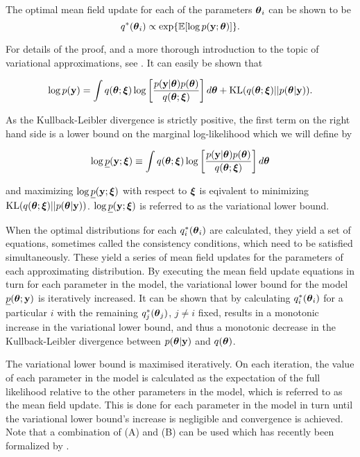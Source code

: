 The optimal mean field update for each of the parameters ${\boldsymbol \theta}_i$ can be shown to be
$$
	q^*({\boldsymbol \theta}_i) \propto \exp \{ \mathbb{E} [\log p({\bf y}; {\boldsymbol \theta})] \}.
$$

\noindent For details of the proof, and a more thorough introduction to the topic of variational
approximations, see \cite{Ormerod2010}. It can easily be shown that

$$
	\displaystyle \log p({\bf y}) = \int q({\boldsymbol \theta};{\boldsymbol \xi}) \log \left[ \frac{p({\bf y}|{\boldsymbol \theta})p({\boldsymbol \theta})}{q({\boldsymbol \theta};{\boldsymbol \xi})} \right] d{\boldsymbol \theta} + \text{KL}(q({\boldsymbol \theta};{\boldsymbol \xi})||p({\boldsymbol \theta}|{\bf y})).
$$

\noindent As the Kullback-Leibler divergence is strictly positive, the first term on the right hand side
is a lower bound on the marginal log-likelihood which we will define by

$$
	\displaystyle \log \underline{p}({\bf y};{\boldsymbol \xi}) \equiv \int q({\boldsymbol \theta};{\boldsymbol \xi})  \log \left[ \frac{p({\bf y}|{\boldsymbol \theta})p({\boldsymbol \theta})}{q({\boldsymbol \theta};{\boldsymbol \xi})} \right] d{\boldsymbol \theta}
$$

\noindent and maximizing $\log \underline{p}({\bf y};{\boldsymbol \xi})$ with respect to ${\boldsymbol \xi}$ is eqivalent to minimizing
$\text{KL}(q({\boldsymbol \theta};{\boldsymbol \xi})||p({\boldsymbol \theta}|{\bf y}))$. $\log \underline{p}({\bf y};{\boldsymbol \xi})$ is referred to as the
variational lower bound.

When the optimal distributions for each $q_i^*({\boldsymbol \theta}_i)$ are calculated, they yield a set of equations,
sometimes called the consistency conditions, which need to be  satisfied simultaneously. These yield a series
of mean field updates for the parameters of each approximating distribution. By executing the mean field
update equations in turn for each parameter in the model, the variational lower bound for the model
$\underline{p}({\boldsymbol \theta}; {\bf y})$ is iteratively increased. It can be shown that by calculating $q_i^*({\boldsymbol \theta}_i)$
for  a particular $i$ with the remaining $q_j^*({\boldsymbol \theta}_j)$, $j\ne i$ fixed, results in a monotonic increase in
the variational lower bound, and thus a monotonic decrease in the Kullback-Leibler divergence between
$p({\boldsymbol \theta}|{\bf y})$ and $q({\boldsymbol \theta})$.

The variational lower bound is maximised iteratively. On each iteration, the value of each parameter in the
model is calculated as the expectation of the full likelihood relative to the other parameters in the model,
which is referred to as the mean field update. This is done for each parameter in the model in turn until the
variational lower bound's increase is negligible and convergence is achieved. Note that a combination of (A)
and (B) can be used which has recently been formalized by \cite{Rohde2015}.

